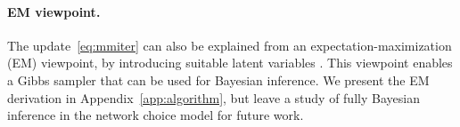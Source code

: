 \paragraph{EM viewpoint.}
The update~\eqref{eq:mmiter} can also be explained from an expectation-maximization (EM) viewpoint, by introducing suitable latent variables \citep{caron2012efficient}.
This viewpoint enables a Gibbs sampler that can be used for Bayesian inference.
We present the EM derivation in Appendix~\ref{app:algorithm}, but leave a study of fully Bayesian inference in the network choice model for future work.
